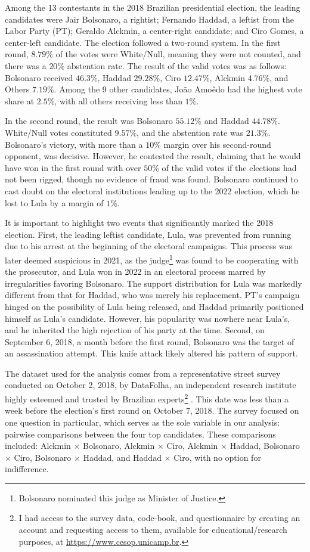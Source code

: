 \documentclass[hidelinks,11pt]{article} \usepackage[utf8]{inputenc}
\begin{document}
Among the 13 contestants in the 2018 Brazilian presidential election, the leading candidates were Jair Bolsonaro, a rightist; Fernando Haddad, a leftist from the Labor Party (PT); Geraldo Alckmin, a center-right candidate; and Ciro Gomes, a center-left candidate. The election followed a two-round system. In the first round, \(8.79\%\) of the votes were White/Null, meaning they were not counted, and there was a \(20\%\) abstention rate. The result of the valid votes was as follows: Bolsonaro received \(46.3\%\), Haddad \(29.28\%\), Ciro \(12.47\%\), Alckmin \(4.76\%\), and Others \(7.19\%\). Among the 9 other candidates, Jo\~ao Amo\^edo had the highest vote share at \(2.5\%\), with all others receiving less than \(1\%\).

In the second round, the result was Bolsonaro \(55.12\%\) and Haddad \(44.78\%\). White/Null votes constituted \(9.57\%\), and the abstention rate was \(21.3\%\). Bolsonaro's victory, with more than a \(10\%\) margin over his second-round opponent, was decisive. However, he contested the result, claiming that he would have won in the first round with over \(50\%\) of the valid votes if the elections had not been rigged, though no evidence of fraud was found. Bolsonaro continued to cast doubt on the electoral institutions leading up to the 2022 election, which he lost to Lula by a margin of \(1\%\).


It is important to highlight two events that significantly marked the 2018 election. First, the leading leftist candidate, Lula, was prevented from running due to his arrest at the beginning of the electoral campaigns. This process was later deemed suspicious in 2021, as the judge\footnote{Bolsonaro nominated this judge as Minister of Justice.} was found to be cooperating with the prosecutor, and Lula won in 2022 in an electoral process marred by irregularities favoring Bolsonaro. The support distribution for Lula was markedly different from that for Haddad, who was merely his replacement. PT's campaign hinged on the possibility of Lula being released, and Haddad primarily positioned himself as Lula's candidate. However, his popularity was nowhere near Lula's, and he inherited the high rejection of his party at the time. Second, on September 6, 2018, a month before the first round, Bolsonaro was the target of an assassination attempt. This knife attack likely altered his pattern of support.


The dataset used for the analysis comes from a representative street survey conducted on October 2, 2018, by DataFolha, an independent research institute highly esteemed and trusted by Brazilian experts\footnote{I had access to the
  survey data, code-book, and questionnaire by creating an account and
  requesting access to them, available for educational/research purposes,   at \url{https://www.cesop.unicamp.br}.} . This date was less than a week before the election's first round on October 7, 2018. The survey focused on one question in particular, which serves as the sole variable in our analysis: pairwise comparisons between the four top candidates. These comparisons included: Alckmin \(\times\) Bolsonaro, Alckmin \(\times\) Ciro, Alckmin \(\times\) Haddad, Bolsonaro \(\times\) Ciro, Bolsonaro \(\times\) Haddad, and Haddad \(\times\) Ciro, with no option for indifference.
\end{document}
